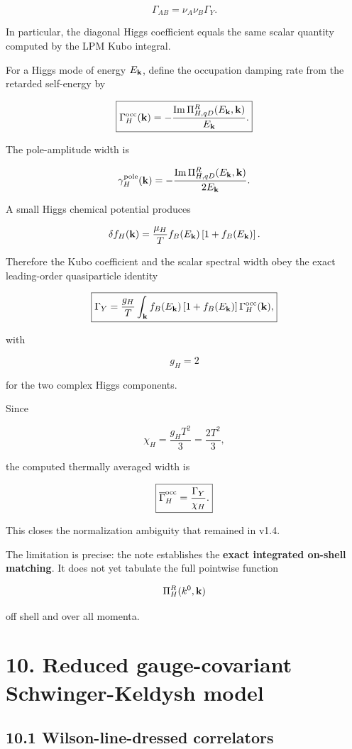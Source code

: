 \documentclass[
  10pt,
]{article}
\begin{document}
\[
\boxed{
\Gamma_{AB}
=
\nu_A\nu_B\Gamma_Y.
}
\]

In particular, the diagonal Higgs coefficient equals the same scalar
quantity computed by the LPM Kubo integral.

For a Higgs mode of energy \(E_{\bf k}\), define the occupation damping
rate from the retarded self-energy by

\[
\boxed{
\Gamma_H^{\rm occ}({\bf k})
=
-\frac{
\operatorname{Im}\Pi_{H,qD}^R(E_{\bf k},{\bf k})
}{E_{\bf k}}.
}
\]

The pole-amplitude width is

\[
\gamma_H^{\rm pole}({\bf k})
=
-\frac{
\operatorname{Im}\Pi_{H,qD}^R(E_{\bf k},{\bf k})
}{2E_{\bf k}}.
\]

A small Higgs chemical potential produces

\[
\delta f_H({\bf k})
=
\frac{\mu_H}{T}
f_B(E_{\bf k})
\left[1+f_B(E_{\bf k})\right].
\]

Therefore the Kubo coefficient and the scalar spectral width obey the
exact leading-order quasiparticle identity

\[
\boxed{
\Gamma_Y
=
\frac{g_H}{T}
\int_{\bf k}
 f_B(E_{\bf k})
\left[1+f_B(E_{\bf k})\right]
\Gamma_H^{\rm occ}({\bf k}),
}
\]

with

\[
g_H=2
\]

for the two complex Higgs components.

Since

\[
\chi_H
=
\frac{g_HT^2}{3}
=
\frac{2T^2}{3},
\]

the computed thermally averaged width is

\[
\boxed{
\overline\Gamma_H^{\rm occ}
=
\frac{\Gamma_Y}{\chi_H}.
}
\]

This closes the normalization ambiguity that remained in v1.4.

The limitation is precise: the note establishes the \textbf{exact
integrated on-shell matching}. It does not yet tabulate the full
pointwise function

\[
\Pi_H^R(k^0,{\bf k})
\]

off shell and over all momenta.

\section{10. Reduced gauge-covariant Schwinger-Keldysh
model}\label{reduced-gauge-covariant-schwinger-keldysh-model}

\subsection{10.1 Wilson-line-dressed
correlators}\label{wilson-line-dressed-correlators}
\end{document}
